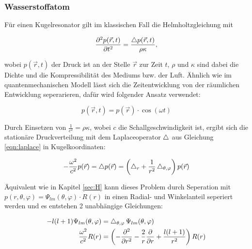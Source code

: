 \subsubsection{Wasserstoffatom}
\label{sec:ana-H}

Für einen Kugelresonator gilt im klassischen Fall die Helmholtzgleichung mit

\begin{equation}
    \frac{\partial^2 p(\vec{r}, t)}{\partial t^2} = \frac{\mathop{}\!\mathbin\bigtriangleup p(\vec{r}, t)}{\rho \kappa} ,
    \label{eqn:helmholtz}
\end{equation}

wobei $p(\vec{r}, t)$ der Druck ist an der Stelle $\vec{r}$ zur Zeit $t$, $\rho$ und $\kappa$ sind dabei die Dichte und die Kompressibilität des Mediums bzw. der Luft. Ähnlich wie im quantenmechanischen Modell lässt sich die Zeitentwicklung von der räumlichen Entwicklung seperarieren, dafür wird folgender Ansatz verwendet:

\begin{equation}
    p(\vec{r}, t) = p(\vec{r}) \cdot \cos(\omega t)
    \label{eqn:akus_sep}
\end{equation}

Durch Einsetzen von $\frac{1}{c^2} = \rho \kappa$, wobei $c$ die Schallgeschwindigkeit ist, ergibt sich die stationäre Druckverteilung mit dem Laplaceoperator $\mathop{}\!\mathbin\bigtriangleup$ aus Gleichung \eqref{eqn:laplace} in Kugelkoordinaten:

\begin{equation}
    - \frac{\omega^2}{c^2} p(\vec{r}) = \mathop{}\!\mathbin\bigtriangleup p(\vec{r}) = \left( \mathop{}\!\mathbin\bigtriangleup_r + \frac{1}{r^2} \mathop{}\!\mathbin\bigtriangleup_{\theta, \varphi} \right) p(\vec{r})
    \label{eqn:stationaer}
\end{equation}

Äquivalent wie in Kapitel \ref{sec:H} kann dieses Problem durch Seperation mit $p(r, \theta, \varphi) = \Psi_{lm}(\theta, \varphi) \cdot R(r)$ in einen Radial- und Winkelanteil seperiert werden und es entstehen 2 unabhängige Gleichungen:

\begin{align}
    -l(l+1) \Psi_{lm} (\theta, \varphi) &= \mathop{}\!\mathbin\bigtriangleup_{\theta, \varphi} \, \Psi_{lm} (\theta, \varphi)
    \label{eqn:akus_winkel} \\
    \frac{\omega^2}{c^2} R(r) &= \left( - \frac{\partial^2}{\partial r^2} - \frac{2}{r} \frac{\partial}{\partial r} + \frac{l(l+1)}{r^2} \right) R(r)
    \label{eqn:akus_raeumlich}
\end{align}

